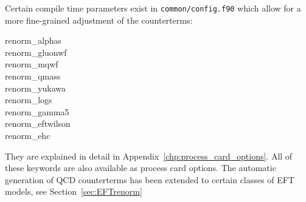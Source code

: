 Certain compile time parameters exist in \texttt{common/config.f90} which allow for a more fine-grained adjustment of the counterterms:

{\ttfamily
    \noindent renorm\_alphas\\
    renorm\_gluonwf\\
    renorm\_mqwf\\
    renorm\_qmass\\
    renorm\_yukawa\\
    renorm\_logs\\
    renorm\_gamma5\\
    renorm\_eftwilson\\
    renorm\_ehc
}

They are explained in detail in Appendix~\ref{chp:process_card_options}. All of these keywords are also available as process card options. The automatic generation of QCD counterterms has been extended to certain classes of EFT models, see Section~\ref{sec:EFTrenorm}

